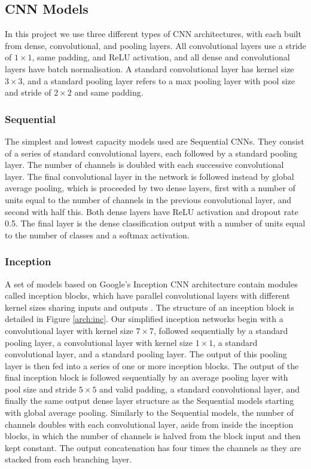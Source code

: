 \documentclass[12pt]{article}
\begin{document}
\subsection{CNN Models}
In this project we use three different types of CNN architectures, with each built from dense, convolutional, and pooling layers. All convolutional layers use a stride of $1\times1$, same padding, and ReLU activation, and all dense and convolutional layers have batch normalisation. A standard convolutional layer has kernel size $3\times3$, and a standard pooling layer refers to a max pooling layer with pool size and stride of $2\times2$ and same padding.

\subsubsection{Sequential}
The simplest and lowest capacity models used are Sequential CNNs. They consist of a series of standard convolutional layers, each followed by a standard pooling layer. The number of channels is doubled with each successive convolutional layer. The final convolutional layer in the network is followed instead by global average pooling, which is proceeded by two dense layers, first with a number of units equal to the number of channels in the previous convolutional layer, and second with half this. Both dense layers have ReLU activation and dropout rate 0.5. The final layer is the dense classification output with a number of units equal to the number of classes and a softmax activation.

\subsubsection{Inception}
A set of models based on Google's Inception CNN architecture contain modules called inception blocks, which have parallel convolutional layers with different kernel sizes sharing inputs and outputs \cite{Szegedy15}. The structure of an inception block is detailed in Figure \ref{arch:inc}. Our simplified inception networks begin with a convolutional layer with kernel size $7\times7$, followed sequentially by a standard pooling layer, a convolutional layer with kernel size $1\times1$, a standard convolutional layer, and a standard pooling layer. The output of this pooling layer is then fed into a series of one or more inception blocks. The output of the final inception block is followed sequentially by an average pooling layer with pool size and stride $5\times5$ and valid padding, a standard convolutional layer, and finally the same output dense layer structure as the Sequential models starting with global average pooling. Similarly to the Sequential models, the number of channels doubles with each convolutional layer, aside from inside the inception blocks, in which the number of channels is halved from the block input and then kept constant. The output concatenation has four times the channels as they are stacked from each branching layer.
\end{document}
